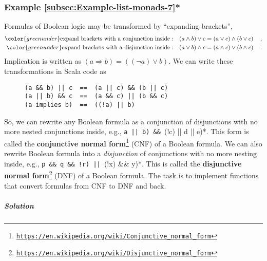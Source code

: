\subsubsection{Example \label{subsec:Example-list-monads-7}\ref{subsec:Example-list-monads-7}{*}}

Formulas of Boolean logic may be transformed by \textsf{``}expanding brackets\textsf{''},
\begin{align*}
{\color{greenunder}\text{expand brackets with a conjunction inside}:}\quad & (a\wedge b)\vee c=\left(a\vee c\right)\wedge\left(b\vee c\right)\quad,\\
{\color{greenunder}\text{expand brackets with a disjunction inside}:}\quad & (a\vee b)\wedge c=\left(a\wedge c\right)\vee\left(b\wedge c\right)\quad.
\end{align*}
Implication is written as $(a\Rightarrow b)=((\neg a)\vee b)$. We
can write these transformations in Scala code as

\begin{wrapfigure}{l}{0.4\columnwidth}%
\vspace{-0.6\baselineskip}
\begin{lstlisting}
(a && b) || c  ==  (a || c) && (b || c)
(a || b) && c  ==  (a && c) || (b && c)
(a implies b)  ==  ((!a) || b)
\end{lstlisting}
\vspace{-0.8\baselineskip}
\end{wrapfigure}%

\noindent So, we can rewrite any Boolean formula as a conjunction
of disjunctions with no more nested conjunctions inside, e.g., \lstinline*(a || b) && ((!c) || d || e)*.
This form is called the \textbf{conjunctive normal form}\footnote{\texttt{\href{https://en.wikipedia.org/wiki/Conjunctive_normal_form}{https://en.wikipedia.org/wiki/Conjunctive\_normal\_form}}}
(CNF) of a Boolean formula. We can also rewrite Boolean formula into
a \emph{disjunction} of conjunctions with no more nesting inside,
e.g., \lstinline*(p && q && !r) || ((!x) && y)*. This is called the
\textbf{disjunctive normal form}\footnote{\texttt{\href{https://en.wikipedia.org/wiki/Disjunctive_normal_form}{https://en.wikipedia.org/wiki/Disjunctive\_normal\_form}}}
(DNF) of a Boolean formula. The task is to implement functions that
convert formulas from CNF to DNF and back. 

\subparagraph{Solution}


